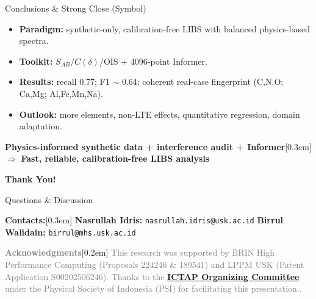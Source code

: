 \documentclass{beamer}
\def\\{}%
\begin{document}
\begin{frame}{Conclusions \& Strong Close (Symbol)}
  \begin{itemize}\setlength{\itemsep}{2pt}
    \item \textbf{Paradigm:} synthetic-only, calibration-free LIBS with balanced physics-based spectra.
    \item \textbf{Toolkit:} $S_{AB}$/$C(\delta)$/OIS + 4096-point Informer.
    \item \textbf{Results:} recall 0.77; F1 $\sim$ 0.64; coherent real-case fingerprint (C,N,O; Ca,Mg; Al,Fe,Mn,Na).
    \item \textbf{Outlook:} more elements, non-LTE effects, quantitative regression, domain adaptation.
  \end{itemize}
  \vspace{0.6em}
  \centering
  \Large \textbf{Physics-informed synthetic data + interference audit + Informer}\\[0.3em]
  \large $\Rightarrow$ \textbf{Fast, reliable, calibration-free LIBS analysis}
\end{frame}

\begin{frame}{}
  \centering
  \vspace{0.5em}
  {\Huge \textcolor{uskGold}{\textbf{Thank You!}}}

  \vspace{0.6em}
  {\Large Questions \& Discussion}

  \vspace{1.0em}
  {\large \textcolor{uskGold}{\textbf{Contacts:}}}\\[0.3em]
  {\small
    	\textbf{Nasrullah Idris:} \texttt{nasrullah.idris@usk.ac.id}\\
    	\textbf{Birrul Walidain:} \texttt{birrul@mhs.usk.ac.id}
  }

  \vfill
  {\footnotesize \textcolor{gray}{\textbf{Acknowledgments}}}\\[0.2em]
  {\scriptsize \textcolor{gray}{This research was supported by BRIN High Performance Computing (Proposals 224246 \& 189541) and LPPM USK (Patent Application S00202506246). Thanks to the \href{https://ictap.physicalsocietyofindonesia.com/}{\textbf{ICTAP Organizing Committee}} under the Physical Society of Indonesia (PSI) for facilitating this presentation..}}
\end{frame}
\end{document}
